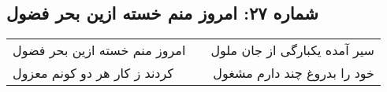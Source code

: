 \begin{center}
\section*{شماره ۲۷: امروز منم خسته ازین بحر فضول}
\label{sec:027}
\begin{longtable}{l p{0.5cm} r}
امروز منم خسته ازین بحر فضول
&&
سیر آمده یکبارگی از جان ملول
\\
کردند ز کار هر دو کونم معزول
&&
خود را بدروغ چند دارم مشغول
\\
\end{longtable}
\end{center}
